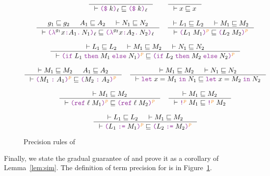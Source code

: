 \begin{figure}[tbp]
  \raggedright
  {\small
  \begin{gather*}
    \inference{}{\vdash \const{k}{\ell} \sqsubseteq \const{k}{\ell}}
    \qquad
    \inference{}{\vdash x \sqsubseteq x}
    \\[2ex]
    \inference{g_1 \sqsubseteq g_2 & A_1 \sqsubseteq A_2 & \vdash N_1 \sqsubseteq N_2 }
              {\vdash \lam{g_1}{x}{A_1}{N_1}{\ell} \sqsubseteq \lam{g_2}{x}{A_2}{N_2}{\ell}}
    \quad
    \inference{\vdash L_1 \sqsubseteq L_2 & \vdash M_1 \sqsubseteq M_2}
              {\vdash \app{L_1}{M_1}{p} \sqsubseteq \app{L_2}{M_2}{p}}
    \\[2ex]
    \inference{\vdash L_1 \sqsubseteq L_2 & \vdash M_1 \sqsubseteq M_2 & \vdash N_1 \sqsubseteq N_2}
              {\vdash \ifexp{L_1}{M_1}{N_1}{p} \sqsubseteq \ifexp{L_2}{M_2}{N_2}{p}}
    \\[2ex]
    \inference{\vdash M_1 \sqsubseteq M_2 & A_1 \sqsubseteq A_2}
              {\vdash \ann{M_1}{A_1}{p} \sqsubseteq \ann{M_2}{A_2}{p}}
    \quad
    \inference{\vdash M_1 \sqsubseteq M_2 & \vdash N_1 \sqsubseteq N_2}
              {\vdash \letexp{x}{M_1}{N_1} \sqsubseteq \letexp{x}{M_2}{N_2}}
    \\[2ex]
    \inference{\vdash M_1 \sqsubseteq M_2}
              {\vdash \refexp{\ell}{M_1}{p} \sqsubseteq \refexp{\ell}{M_2}{p}}
    \quad
    \inference{\vdash M_1 \sqsubseteq M_2}
              {\vdash \deref{M_1}{p} \sqsubseteq \deref{M_2}{p}}
    \\[2ex]
    \inference{\vdash L_1 \sqsubseteq L_2 & \vdash M_1 \sqsubseteq M_2}
              {\vdash \assign{L_1}{M_1}{p} \sqsubseteq \assign{L_2}{M_2}{p}}
  \end{gather*}}
  \caption{Precision rules of \Surface}
  \label{fig:surface-precision}
\end{figure}

Finally, we state the gradual guarantee of \Surface and prove it as a
corollary of Lemma~\ref{lem:sim}. The definition of term precision
for \Surface is in Figure~\ref{fig:surface-precision}.

